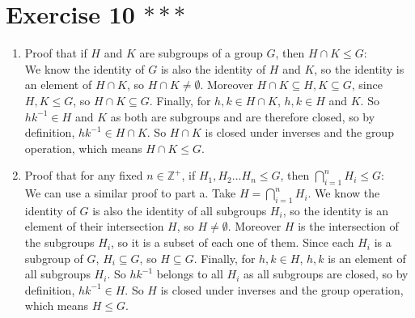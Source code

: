 \documentclass{article}
\newcommand{\Z}{\mathbb{Z}}
\begin{document}
    \section*{Exercise 10 $***$}
    \begin{enumerate}[label=\textbf{\alph*.}]
        \item 
            Proof that if $H$ and $K$ are subgroups of a group $G$,
            then $H \cap K \leqslant G$: \\
            We know the identity of $G$ is also the identity of $H$ and $K$,
            so the identity is an element of $H \cap K$,
            so $H \cap K \neq \emptyset$.
            Moreover $H \cap K \subseteq H, K \subseteq G$,
            since $H, K \leqslant G$,
            so $H \cap K \subseteq G$.
            Finally, for $h, k \in H \cap K$,
            $h, k \in H$ and $K$.
            So $hk^{-1} \in H$ and $K$
            as both are subgroups and are therefore closed,
            so by definition, $hk^{-1} \in H \cap K$.
            So $H \cap K$ is closed under inverses and the group operation,
            which means $H \cap K \leqslant G$.
        \item
            Proof that for any fixed $n \in \Z^+$,
            if $H_1, H_2 ... H_n \leqslant G$,
            then $\bigcap_{i = 1}^n H_i \leqslant G$: \\
            We can use a similar proof to part a.
            Take $H = \bigcap_{i = 1}^n H_i$.
            We know the identity of $G$ is also the identity of all 
            subgroups $H_i$,
            so the identity is an element of their intersection $H$,
            so $H \neq \emptyset$.
            Moreover $H$ is the intersection of the subgroups $H_i$,
            so it is a subset of each one of them.
            Since each $H_i$ is a subgroup of $G$, $H_i\subseteq G$,
            so $H \subseteq G$.
            Finally, for $h, k \in H$,
            $h, k$ is an element of all subgroups $H_i$.
            So $hk^{-1}$ belongs to all $H_i$
            as all subgroups are closed,
            so by definition, $hk^{-1} \in H$.
            So $H$ is closed under inverses and the group operation,
            which means $H \leqslant G$.
    \end{enumerate}
\end{document}
